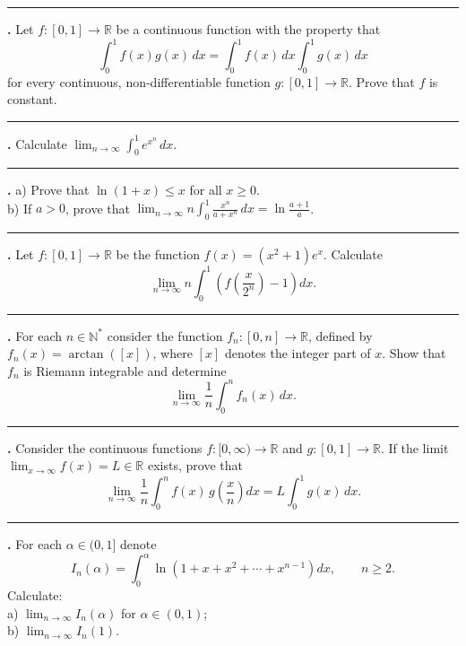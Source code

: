\documentclass[11pt]{article}
\newcounter{probnum}
\newenvironment{problembox}{\par\noindent\rule{\linewidth}{0.5pt}\vspace{5pt}\par}{\vspace{2pt}}
\begin{document}
\begin{problembox}
\textbf{\theprobnum.} Let $f : [0,1] \to \mathbb{R}$ be a continuous function with the property that
\[
\int_0^1 f(x) g(x)\,dx = \int_0^1 f(x)\,dx \int_0^1 g(x)\,dx
\]
for every continuous, non-differentiable function $g : [0,1] \to \mathbb{R}$. Prove that $f$ is constant.
\end{problembox}

\begin{problembox}
\textbf{\theprobnum.} Calculate $\displaystyle\lim_{n \to \infty} \int_0^1 e^{x^n}\,dx$.
\end{problembox}

\begin{problembox}
\textbf{\theprobnum.} a) Prove that $\ln(1+x) \le x$ for all $x \ge 0$.\\
b) If $a > 0$, prove that $\displaystyle\lim_{n \to \infty} n \int_0^1 \frac{x^n}{a+x^n}\,dx = \ln\frac{a+1}{a}$.
\end{problembox}

\begin{problembox}
\textbf{\theprobnum.} Let $f : [0,1] \to \mathbb{R}$ be the function $f(x) = (x^2+1)e^x$. Calculate
\[
\lim_{n \to \infty} n \int_0^1 \left(f\left(\frac{x}{2^n}\right) - 1\right) dx.
\]
\end{problembox}

\begin{problembox}
\textbf{\theprobnum.} For each $n \in \mathbb{N}^*$ consider the function $f_n : [0,n] \to \mathbb{R}$, defined by $f_n(x) = \arctan([x])$, where $[x]$ denotes the integer part of $x$. Show that $f_n$ is Riemann integrable and determine
\[
\lim_{n \to \infty} \frac{1}{n} \int_0^n f_n(x)\,dx.
\]
\end{problembox}

\begin{problembox}
\textbf{\theprobnum.} Consider the continuous functions $f : [0,\infty) \to \mathbb{R}$ and $g : [0,1] \to \mathbb{R}$. If the limit $\lim_{x \to \infty} f(x) = L \in \mathbb{R}$ exists, prove that
\[
\lim_{n \to \infty} \frac{1}{n} \int_0^n f(x)\, g\left(\frac{x}{n}\right) dx = L \int_0^1 g(x)\,dx.
\]
\end{problembox}

\begin{problembox}
\textbf{\theprobnum.} For each $\alpha \in (0,1]$ denote
\[
I_n(\alpha) = \int_0^{\alpha} \ln\left(1+x+x^2+\cdots+x^{n-1}\right) dx, \qquad n \ge 2.
\]
Calculate:\\
a) $\displaystyle\lim_{n \to \infty} I_n(\alpha)$ for $\alpha \in (0,1)$;\\
b) $\displaystyle\lim_{n \to \infty} I_n(1)$.
\end{problembox}
\end{document}
